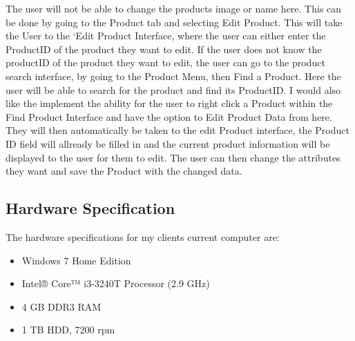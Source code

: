 The user will not be able to change the products image or name here. This can be done by going to the Product tab and selecting Edit Product. This will take the User to the `Edit Product Interface, where the user can either enter the ProductID of the product they want to edit. If the user does not know the productID of the product they want to edit, the user can go to the product search interface, by going to the Product Menu, then Find a Product. Here the user will be able to search for the product and find its ProductID. I would also like the implement the ability for the user to right click a Product within the Find Product Interface and have the option to Edit Product Data from here. They will then automatically be taken to the edit Product interface, the Product ID field will allready be filled in and the current product information will be displayed to the user for them to edit. The user can then change the attributes they want and save the Product with the changed data. 

\subsection{Hardware Specification}
	
The hardware specifications for my clients current computer are: \par

\begin{itemize}
\item Windows 7 Home Edition
\item Intel® Core™ i3-3240T Processor (2.9 GHz)
\item 4 GB DDR3 RAM
\item 1 TB HDD, 7200 rpm
\end{itemize}




